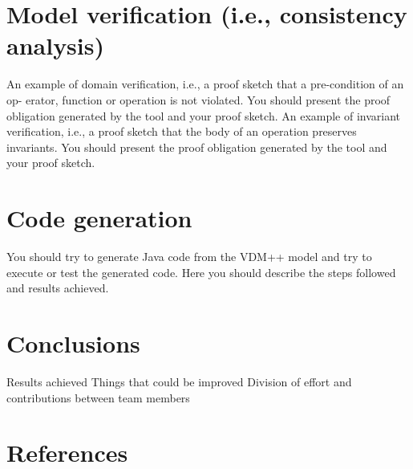 \documentclass[a4paper]{article}
\begin{document}
\section{Model verification (i.e., consistency analysis)}
An example of domain verification, i.e., a proof sketch that a pre-condition of an op-
erator, function or operation is not violated. You 
should present the proof obligation 
generated by the tool and your proof sketch.  
An example of invariant verification, i.e., a proof sketch that the body of an operation 
preserves  invariants.  You  should  present  the  proof obligation  generated  by  the  tool 
and your proof sketch. 
\section{Code generation}
You should try to generate Java code from the VDM++ model and try to execute or test 
the generated code. Here you should describe the steps followed and results achieved. 
\section{Conclusions}
Results achieved  
Things that could be improved 
Division of effort and contributions between team members 
\section{References}
\end{document}
